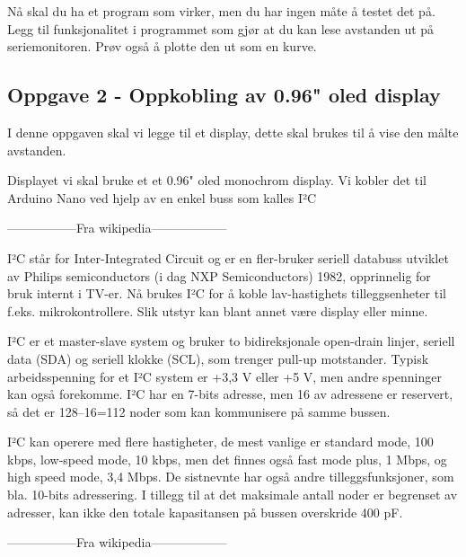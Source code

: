 Nå skal du ha et program som virker, men du har ingen måte å testet det på. Legg til funksjonalitet i programmet som gjør at du kan lese avstanden ut på seriemonitoren. Prøv også  å plotte den ut som en kurve. 

\subsection*{Oppgave 2 -  Oppkobling av 0.96" oled display}
I denne oppgaven skal vi legge til et display, dette skal brukes til å vise den målte avstanden. 


\vskip 5pt 
Displayet vi skal bruke et et 0.96" oled monochrom display. Vi kobler det til Arduino Nano ved hjelp av en enkel buss som kalles I²C

\vskip 5pt 
-----------------Fra wikipedia------------------

\vskip 5pt 
I²C står for Inter-Integrated Circuit og er en fler-bruker seriell databuss utviklet av Philips semiconductors (i dag NXP Semiconductors) 1982, opprinnelig for bruk internt i TV-er. Nå brukes I²C for å koble lav-hastighets tilleggsenheter til f.eks. mikrokontrollere. Slik utstyr kan blant annet være display eller minne.

\vskip 5pt 
I²C er et master-slave system og bruker to bidireksjonale open-drain linjer, seriell data (SDA) og seriell klokke (SCL), som trenger pull-up motstander. Typisk arbeidsspenning for et I²C system er +3,3 V eller +5 V, men andre spenninger kan også forekomme. I²C har en 7-bits adresse, men 16 av adressene er reservert, så det er 128–16=112 noder som kan kommunisere på samme bussen.

\vskip 5pt 
I²C kan operere med flere hastigheter, de mest vanlige er standard mode, 100 kbps, low-speed mode, 10 kbps, men det finnes også fast mode plus, 1 Mbps, og high speed mode, 3,4 Mbps. De sistnevnte har også andre tilleggsfunksjoner, som bla. 10-bits adressering. I tillegg til at det maksimale antall noder er begrenset av adresser, kan ikke den totale kapasitansen på bussen overskride 400 pF.

\vskip 5pt 
-----------------Fra wikipedia------------------
\vskip 5pt

